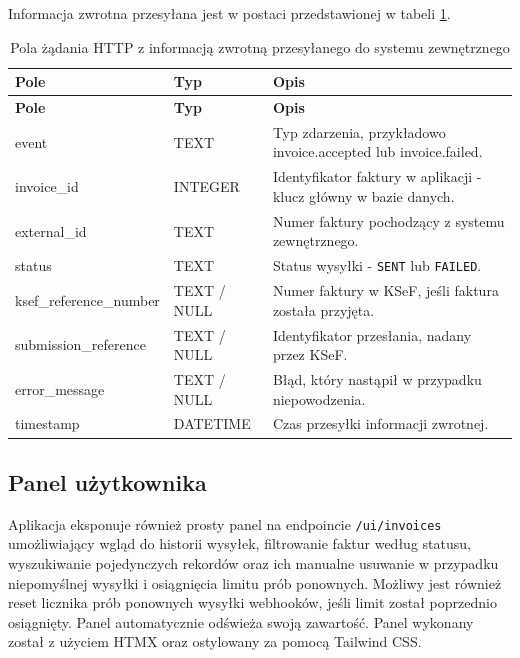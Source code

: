 \noindent Informacja zwrotna przesyłana jest w postaci przedstawionej w tabeli \ref{tab:webhook_payload}.
\begin{small}
\begin{longtable}{>{\raggedright\arraybackslash}p{4cm} >{\raggedright\arraybackslash}p{2cm} >{\raggedright\arraybackslash}p{7cm}}
\caption{Pola żądania HTTP z informacją zwrotną przesyłanego do systemu zewnętrznego}
\label{tab:webhook_payload} \\
\toprule
\textbf{Pole} & \textbf{Typ} & \textbf{Opis} \\
\midrule
\endfirsthead

\toprule
\textbf{Pole} & \textbf{Typ} & \textbf{Opis} \\
\midrule
\endhead

\bottomrule
\endfoot

event & TEXT & Typ zdarzenia, przykładowo invoice.accepted lub invoice.failed. \\
invoice\_id & INTEGER & Identyfikator faktury w aplikacji - klucz główny w bazie danych. \\
external\_id & TEXT & Numer faktury pochodzący z systemu zewnętrznego. \\
status & TEXT & Status wysyłki - \texttt{SENT} lub \texttt{FAILED}. \\
ksef\_reference\_number & TEXT / NULL & Numer faktury w KSeF, jeśli faktura została przyjęta. \\
submission\_reference & TEXT / NULL & Identyfikator przesłania, nadany przez KSeF. \\
error\_message & TEXT / NULL & Błąd, który nastąpił w przypadku niepowodzenia. \\
timestamp & DATETIME & Czas przesyłki informacji zwrotnej. \\
\end{longtable}
\end{small}

\subsection{Panel użytkownika}
Aplikacja eksponuje również prosty panel na endpoincie \texttt{/ui/invoices} umożliwiający wgląd do historii wysyłek, filtrowanie faktur według statusu, wyszukiwanie pojedynczych rekordów oraz ich manualne usuwanie w przypadku niepomyślnej wysyłki i osiągnięcia limitu prób ponownych. Możliwy jest również reset licznika prób ponownych wysyłki webhooków, jeśli limit został poprzednio osiągnięty. Panel automatycznie odświeża swoją zawartość. Panel wykonany został z użyciem HTMX oraz ostylowany za pomocą Tailwind CSS.

